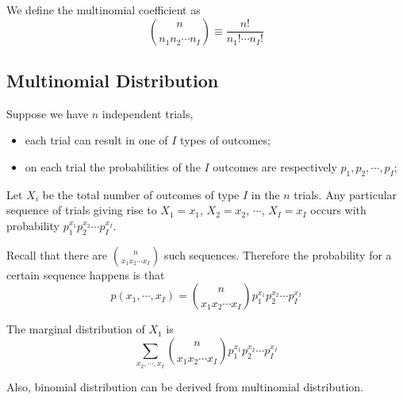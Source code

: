 \begin{definition}
	We define the multinomial coefficient as 
	\[{n \choose n_1 n_2 \cdots n_I} \equiv \frac{n!}{n_1! \cdots n_I!}\]
\end{definition}

\subsection{Multinomial Distribution}
Suppose we have $n$ independent trials, 
\begin{itemize}
	\item each trial can result in one of $I$ types of outcomes;
	\item on each trial the probabilities of the $I$ outcomes are respectively
$p_1, p_2, \cdots, p_I$;
\end{itemize}
Let $X_i$ be the total number of outcomes of type $I$ in the $n$ trials. Any particular sequence of trials giving rise to $X_1 = x_1$, $X_2 = x_2$, $\cdots$, $X_I = x_I$ occurs with probability $p_1^{x_1}p_2^{x_2} \cdots p_I^{x_I}$.

Recall that there are ${n \choose x_1x_2\cdots x_I}$ such sequences. Therefore the probability for a certain sequence happens is that
\[p(x_1, \cdots, x_I) = {n \choose x_1 x_2 \cdots x_I} p_1^{x_1}p_2^{x_2} \cdots p_I^{x_I}\]

The marginal distribution of $X_1$ is 
\[\sum_{x_2, \cdots, x_I} {n \choose x_1 x_2 \cdots x_I} p_1^{x_1}p_2^{x_2} \cdots p_I^{x_I}\]

Also, binomial distribution can be derived from multinomial distribution.